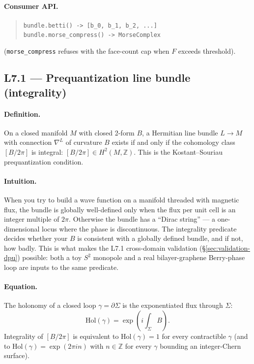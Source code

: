 \documentclass[11pt,letterpaper]{article}
\begin{document}
\paragraph{Consumer API.}
\begin{quote}
\sloppy
\texttt{bundle.betti() -> [b\_0, b\_1, b\_2, ...]} \\
\texttt{bundle.morse\_compress() -> MorseComplex}
\end{quote}
(\texttt{morse\_compress} refuses with the face-count cap when $F$
exceeds threshold).


\subsection{L7.1 --- Prequantization line bundle (integrality)}

\paragraph{Definition.}
On a closed manifold $M$ with closed 2-form $B$, a Hermitian line
bundle $L \to M$ with connection $\nabla^L$ of curvature $B$ exists
if and only if the cohomology class $[B / 2\pi]$ is integral:
$[B / 2\pi] \in H^2(M, \mathbb{Z})$. This is the
Kostant--Souriau prequantization condition.

\paragraph{Intuition.}
When you try to build a wave function on a manifold threaded with
magnetic flux, the bundle is globally well-defined only when the
flux per unit cell is an integer multiple of $2\pi$. Otherwise the
bundle has a ``Dirac string'' --- a one-dimensional locus where the
phase is discontinuous. The integrality predicate decides whether
your $B$ is consistent with a globally defined bundle, and if not,
how badly. This is what makes the L7.1 cross-domain validation
(\S\ref{sec:validation-dpu}) possible: both a toy $S^2$ monopole
and a real bilayer-graphene Berry-phase loop are inputs to the same
predicate.

\paragraph{Equation.}
The holonomy of a closed loop $\gamma = \partial \Sigma$ is the
exponentiated flux through $\Sigma$:
\[
\mathrm{Hol}(\gamma) = \exp\!\left( i \int_\Sigma B \right).
\]
Integrality of $[B / 2\pi]$ is equivalent to
$\mathrm{Hol}(\gamma) = 1$ for every contractible $\gamma$ (and to
$\mathrm{Hol}(\gamma) = \exp(2\pi i n)$ with $n \in \mathbb{Z}$ for
every $\gamma$ bounding an integer-Chern surface).
\end{document}
